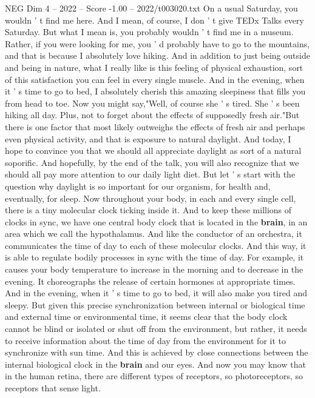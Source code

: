 \begin{textsample}{NEG Dim 4 – 2022 – Score -1.00 – 2022/t003020.txt}  \label{ex:f4_neg_057}
On a usual Saturday, you wouldn ' t find me here.
And I mean, of course, I don ' t give TEDx Talks every Saturday.
But what I mean is, you probably wouldn ' t find me in a museum.
Rather, if you were looking for me, you ' d probably have to go to the mountains, and that is because I absolutely love hiking.
And in addition to just being outside and being in nature, what I really like is this feeling of physical exhaustion, sort of this satisfaction you can feel in every single muscle.
And in the evening, when it ' s time to go to bed, I absolutely cherish this amazing sleepiness that fills you from head to toe.
Now you might say,"Well, of course she ' s tired.
She ' s been hiking all day.
Plus, not to forget about the effects of supposedly fresh air."But there is one factor that most likely outweighs the effects of fresh air and perhaps even physical activity, and that is exposure to natural daylight.
And today, I hope to convince you that we should all appreciate daylight as sort of a natural soporific.
And hopefully, by the end of the talk, you will also recognize that we should all pay more attention to our daily light diet.
But let ' s start with the question why daylight is so important for our organism, for health and, eventually, for sleep.
Now throughout your body, in each and every single cell, there is a tiny molecular clock ticking inside it.
And to keep these millions of clocks in sync, we have one central body clock that is located in the \textbf{brain}, in an area which we call the hypothalamus.
And like the conductor of an orchestra, it communicates the time of day to each of these molecular clocks.
And this way, it is able to regulate bodily processes in sync with the time of day.
For example, it causes your body temperature to increase in the morning and to decrease in the evening.
It choreographs the release of certain hormones at appropriate times.
And in the evening, when it ' s time to go to bed, it will also make you tired and sleepy.
But given this precise synchronization between internal or biological time and external time or environmental time, it seems clear that the body clock cannot be blind or isolated or shut off from the environment, but rather, it needs to receive information about the time of day from the environment for it to synchronize with sun time.
And this is achieved by close connections between the internal biological clock in the \textbf{brain} and our eyes.
And now you may know that in the human retina, there are different types of receptors, so photoreceptors, so receptors that sense light.

\end{textsample}
